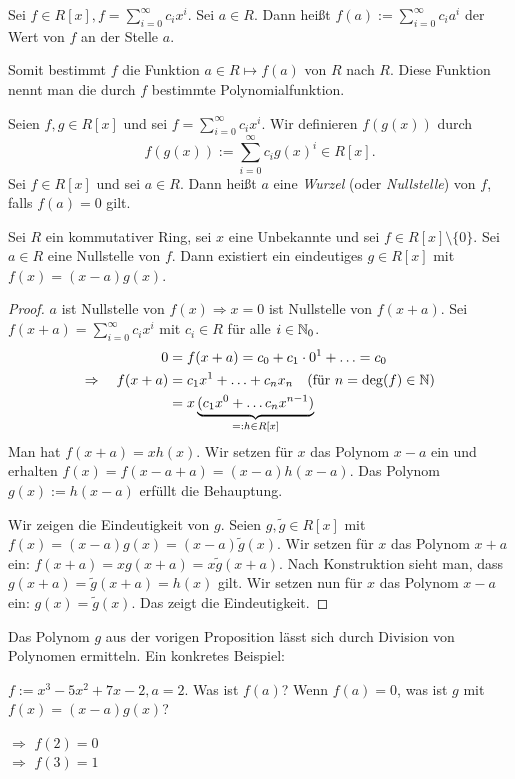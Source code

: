 \noindent Sei $ f \in R[x], f = \sum_{i = 0}^{\infty} c_ix^i $. Sei $ a \in R $. Dann heißt $ f(a) := \sum_{i = 0}^{\infty} c_ia^i $ der Wert von $ f $ an der Stelle $ a $.

Somit bestimmt $ f $ die Funktion $ a \in R \mapsto f(a) $ von $ R $ nach $ R $. Diese Funktion nennt man die durch $ f $ bestimmte Polynomialfunktion.

Seien $ f,g \in R[x] $ und sei $ f = \sum_{i = 0}^{\infty} c_ix^i $. Wir definieren $ f(g(x)) $ durch
\begin{equation*}
	f(g(x)) := \sum\limits_{i = 0}^{\infty} c_ig(x)^i \in R[x].
\end{equation*}
Sei $ f \in R[x] $ und sei $ a \in R $. Dann heißt $ a $ eine \emph{Wurzel} (oder \emph{Nullstelle}) von $ f $, falls $ f(a) = 0 $ gilt.

\begin{propn}
	Sei $ R $ ein kommutativer Ring, sei $ x $ eine Unbekannte und sei $ f \in R[x] \setminus \{ 0 \} $. Sei $ a \in R $ eine Nullstelle von $ f $. Dann existiert ein eindeutiges $ g \in R[x] $ mit $ f(x) = (x-a)g(x) $.
\end{propn}
\begin{proof}
	$ a $ ist Nullstelle von $ f(x) \Rightarrow x=0 $  ist Nullstelle von $ f(x+a) $. Sei $ f(x+a) = \sum_{i=0}^{\infty} c_ix^i $ mit $ c_i \in R $ für alle $ i \in \mathbb N_0 $.
	\begin{align*}
		0 &= f(x+a) = c_0 + c_1 \cdot 0^1 + \ldots = c_0 \\
		\Rightarrow \quad f(x+a) &= c_1x^1 + \ldots + c_nx_n \quad \text{(für $ n = \deg(f) \in \mathbb N $)} \\
		&= x \underbrace{(c_1x^0 + \ldots c_nx^{n-1})}_{=: h \in R[x]}
	\end{align*}
	Man hat $ f(x+a) = x h(x) $. Wir setzen für $ x $ das Polynom $ x-a $ ein und erhalten $ f(x) = f(x-a+a) = (x-a)h(x-a) $. Das Polynom $ g(x) := h(x-a) $ erfüllt die Behauptung.
	
	Wir zeigen die Eindeutigkeit von $ g $. Seien $ g, \widetilde{g} \in R[x] $ mit $ f(x) = (x-a)g(x) = (x-a)\widetilde{g}(x) $.
	Wir setzen für $ x $ das Polynom $ x+a $ ein: $ f(x+a) = xg(x+a) = x\widetilde{g}(x+a) $.
	Nach Konstruktion sieht man, dass $ g(x+a) = \widetilde{g}(x+a) = h(x) $ gilt. Wir setzen nun für $ x $ das Polynom $ x-a $ ein: $ g(x) = \widetilde{g}(x) $. Das zeigt die Eindeutigkeit.
\end{proof}

\begin{bem}
	Das Polynom $ g $ aus der vorigen Proposition lässt sich durch Division von Polynomen ermitteln. Ein konkretes Beispiel:
\end{bem}
\begin{bsp}
	$ f := x^3 - 5x^2 + 7x - 2, a = 2 $. Was ist $ f(a) $? Wenn $ f(a) = 0 $, was ist $ g $ mit $ f(x) = (x-a)g(x) $?
	
	\begin{center} 
	 \qquad $\Longrightarrow$ \qquad $f(2)=0$
	\\
	 \qquad $\Longrightarrow$ \qquad $f(3)=1$
	\end{center}
\end{bsp}

